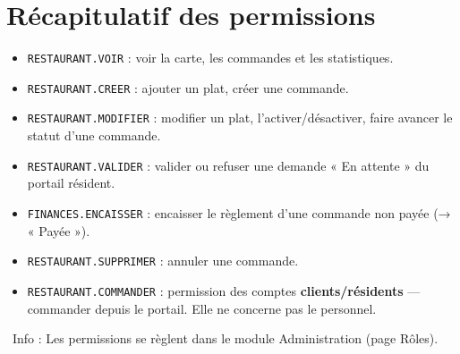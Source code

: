 \documentclass[12pt,a4paper]{article}
\newcommand{\info}[1]{\par\noindent\textcolor{lagoon}{\faInfoCircle\ Info : #1}\par}
\begin{document}
\newpage

\section{Récapitulatif des permissions}

\begin{itemize}[label=\textcolor{lagoon}{\faKey}]
  \item \texttt{RESTAURANT.VOIR} : voir la carte, les commandes et les statistiques.
  \item \texttt{RESTAURANT.CREER} : ajouter un plat, créer une commande.
  \item \texttt{RESTAURANT.MODIFIER} : modifier un plat, l'activer/désactiver, faire avancer le statut d'une commande.
  \item \texttt{RESTAURANT.VALIDER} : valider ou refuser une demande « En attente » du portail résident.
  \item \texttt{FINANCES.ENCAISSER} : encaisser le règlement d'une commande non payée (→ « Payée »).
  \item \texttt{RESTAURANT.SUPPRIMER} : annuler une commande.
  \item \texttt{RESTAURANT.COMMANDER} : permission des comptes \textbf{clients/résidents} — commander depuis le portail. Elle ne concerne pas le personnel.
\end{itemize}

\info{Les permissions se règlent dans le module Administration (page Rôles).}

\vfill

\begin{center}
\end{center}
\end{document}
